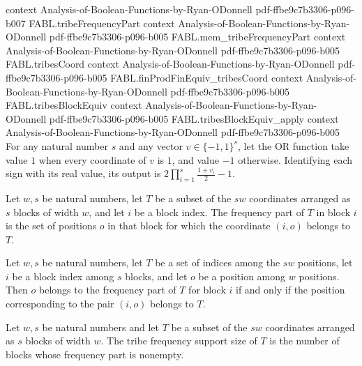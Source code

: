 \begin{theorem}
  {context}
  {Analysis-of-Boolean-Functions-by-Ryan-ODonnell}
  {pdf-ffbe9c7b3306-p096-b007}
\proofstep
  {FABL.tribeFrequencyPart}
  {context}
  {Analysis-of-Boolean-Functions-by-Ryan-ODonnell}
  {pdf-ffbe9c7b3306-p096-b005}
\proofstep
  {FABL.mem_tribeFrequencyPart}
  {context}
  {Analysis-of-Boolean-Functions-by-Ryan-ODonnell}
  {pdf-ffbe9c7b3306-p096-b005}
\proofstep
  {FABL.tribesCoord}
  {context}
  {Analysis-of-Boolean-Functions-by-Ryan-ODonnell}
  {pdf-ffbe9c7b3306-p096-b005}
\proofstep
  {FABL.finProdFinEquiv_tribesCoord}
  {context}
  {Analysis-of-Boolean-Functions-by-Ryan-ODonnell}
  {pdf-ffbe9c7b3306-p096-b005}
\proofstep
  {FABL.tribesBlockEquiv}
  {context}
  {Analysis-of-Boolean-Functions-by-Ryan-ODonnell}
  {pdf-ffbe9c7b3306-p096-b005}
\proofstep
  {FABL.tribesBlockEquiv_apply}
  {context}
  {Analysis-of-Boolean-Functions-by-Ryan-ODonnell}
  {pdf-ffbe9c7b3306-p096-b005}
For any natural number $s$ and any vector $v\in\{-1,1\}^s$, let the OR function take
value $1$ when every coordinate of $v$ is $1$, and value $-1$ otherwise. Identifying
each sign with its real value, its output is $2\prod_{i=1}^s\frac{1+v_i}{2}-1$.
\end{theorem}

\begin{definition}
\label{FABL.tribeFrequencyPart}
\leanok
Let $w,s$ be natural numbers, let $T$ be a subset of the $s w$ coordinates arranged as
$s$ blocks of width $w$, and let $i$ be a block index. The frequency part of $T$ in
block $i$ is the set of positions $o$ in that block for which the coordinate $(i,o)$
belongs to $T$.
\end{definition}

\begin{theorem}
\label{FABL.mem_tribeFrequencyPart}
\leanok
{}
Let $w,s$ be natural numbers, let $T$ be a set of indices among the $sw$ positions, let
$i$ be a block index among $s$ blocks, and let $o$ be a position among $w$ positions.
Then $o$ belongs to the frequency part of $T$ for block $i$ if and only if the position
corresponding to the pair $(i,o)$ belongs to $T$.
\end{theorem}

\begin{definition}
\label{FABL.tribeFrequencySupportSize}
\leanok
{}
Let $w,s$ be natural numbers and let $T$ be a subset of the $s w$ coordinates arranged
as $s$ blocks of width $w$. The tribe frequency support size of $T$ is the number of
blocks whose frequency part is nonempty.
\end{definition}

